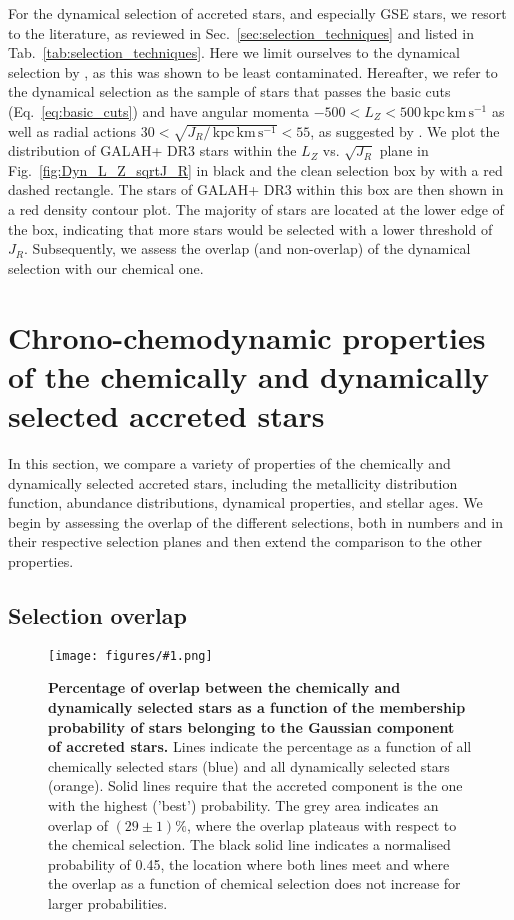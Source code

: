 \documentclass[fleqn,usenatbib]{mnras}
\newcommand{\kpckms}{\,\mathrm{kpc\,km\,s^{-1}}}	%
\newcommand{\codeicon}{{\faCloudDownload}}
\newcommand{\codelink}[1]{\href{https://github.com/svenbuder/buder_galah_accreted_chemistry/tree/main/figures/#1.ipynb}{\codeicon}\,\,}
\newcommand{\oscaption}[2]{\caption{#2 \codelink{#1}}}
\newcommand{\figurecolumnwidth}[3]{\begin{figure} \centering \texttt{[image: figures/\#1.png]}\oscaption{#2}{#3}\label{fig:#1} \end{figure}}
\begin{document}
For the dynamical selection of accreted stars, and especially GSE stars, we resort to the literature, as reviewed in Sec.~\ref{sec:selection_techniques} and listed in Tab.~\ref{tab:selection_techniques}. Here we limit ourselves to the dynamical selection by \citet{Feuillet2021}, as this was shown to be least contaminated. Hereafter, we refer to the dynamical selection as the sample of stars that passes the basic cuts (Eq.~\ref{eq:basic_cuts}) and have angular momenta $-500 < L_Z < 500 \kpckms$ as well as radial actions $30 < \sqrt{J_R / \kpckms} < 55$, as suggested by \citet{Feuillet2021}. We plot the distribution of GALAH+ DR3 stars within the $L_Z$ vs. $\sqrt{J_R}$ plane in Fig.~\ref{fig:Dyn_L_Z_sqrtJ_R} in black and the clean selection box by \citet{Feuillet2021} with a red dashed rectangle. The stars of GALAH+ DR3 within this box are then shown in a red density contour plot. The majority of stars are located at the lower edge of the box, indicating that more stars would be selected with a lower threshold of $J_R$. Subsequently, we assess the overlap (and non-overlap) of the dynamical selection with our chemical one.

\section{Chrono-chemodynamic properties of the chemically and dynamically selected accreted stars} \label{sec:chronochemodynamics}

In this section, we compare a variety of properties of the chemically and dynamically selected accreted stars, including the metallicity distribution function, abundance distributions, dynamical properties, and stellar ages. We begin by assessing the overlap of the different selections, both in numbers and in their respective selection planes and then extend the comparison to the other properties.

\subsection{Selection overlap} \label{sec:overlap_planes}

\figurecolumnwidth{quantitative_overlap_chemdyn}{chronochemodynamic_comparison}{
\textbf{Percentage of overlap between the chemically and dynamically selected stars as a function of the membership probability of stars belonging to the Gaussian component of accreted stars.} Lines indicate the percentage as a function of all chemically selected stars (blue) and all dynamically selected stars (orange). Solid lines require that the accreted component is the one with the highest ('best') probability. The grey area indicates an overlap of $(29\pm1)\%$, where the overlap plateaus with respect to the chemical selection. The black solid line indicates a normalised probability of 0.45, the location where both lines meet and where the overlap as a function of chemical selection does not increase for larger probabilities.
}
\end{document}
